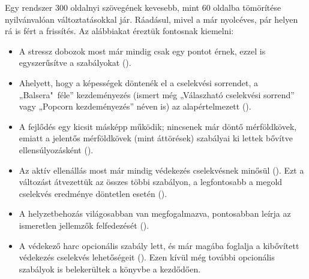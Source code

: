 Egy rendszer 300 oldalnyi szövegének kevesebb, mint 60 oldalba tömörítése nyilvánvalóan változtatásokkal jár. Ráadásul, mivel a  már nyolcéves, pár helyen rá is fért a frissítés. Az alábbiakat éreztük fontosnak kiemelni:
\begin{itemize}
    \item A stressz dobozok most már mindig csak egy pontot érnek, ezzel is egyszerűsítve a szabályokat ().
    \item Ahelyett, hogy a képességek döntenék el a cselekvési sorrendet, a „Balsera"~féle” kezdeményezés (ismert még „Válaszható cselekvési sorrend” vagy „Popcorn kezdeményezés” néven is) az alapértelmezett ().
    \item A fejlődés egy kicsit másképp működik; nincsenek már döntő mérföldkövek, emiatt a jelentős mérföldkövek (mint áttörések) szabályai ki lettek bővítve ellensúlyozásként ().
    \item Az aktív ellenállás most már mindig védekezés cselekvésnek minősül (). Ezt a változást átvezettük az összes többi szabályon, a legfontosabb a megold cselekvés eredménye döntetlen esetén ().
    \item A helyzetbehozás világosabban van megfogalmazva, pontosabban leírja az ismeretlen jellemzők felfedezését ().
    \item A védekező harc opcionális szabály lett, és már magába foglalja a kibővített védekezés cselekvés lehetőségeit (). Ezen kívül még további opcionális szabályok is belekerültek a könyvbe a  kezdődően.
\end{itemize}
